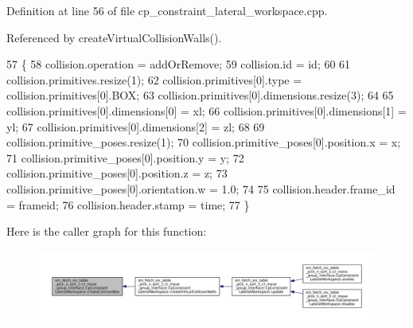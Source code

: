 Definition at line 56 of file cp\+\_\+constraint\+\_\+lateral\+\_\+workspace.\+cpp.



Referenced by create\+Virtual\+Collision\+Walls().


\begin{DoxyCode}
57         \{
58             collision.operation = addOrRemove;
59             collision.id = id;
60 
61             collision.primitives.resize(1);
62             collision.primitives[0].type = collision.primitives[0].BOX;
63             collision.primitives[0].dimensions.resize(3);
64 
65             collision.primitives[0].dimensions[0] = xl;
66             collision.primitives[0].dimensions[1] = yl;
67             collision.primitives[0].dimensions[2] = zl;
68 
69             collision.primitive\_poses.resize(1);
70             collision.primitive\_poses[0].position.x = x;
71             collision.primitive\_poses[0].position.y = y;
72             collision.primitive\_poses[0].position.z = z;
73             collision.primitive\_poses[0].orientation.w = 1.0;
74 
75             collision.header.frame\_id = frameid;
76             collision.header.stamp = time;
77         \}
\end{DoxyCode}
Here is the caller graph for this function\+:
\nopagebreak
\begin{figure}[H]
\begin{center}
\leavevmode
\includegraphics[width=350pt]{classsm__fetch__six__table__pick__n__sort__1_1_1cl__move__group__interface_1_1CpConstraintLateralWorkspace_a55efa9bdca2eb8c91cc01cd29359849c_icgraph}
\end{center}
\end{figure}
\mbox{\label{classsm__fetch__six__table__pick__n__sort__1_1_1cl__move__group__interface_1_1CpConstraintLateralWorkspace_a32b7f02170ebee9e56b55cb69de22ba6}} 
